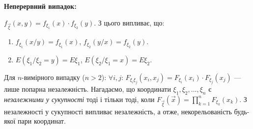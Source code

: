 \noindent\textbf{Неперервний випадок: }

$f_{\vec{\xi}}(x, y) = f_{\xi_1}(x)\cdot f_{\xi_2}(y)$.
З цього випливає, що:

\begin{enumerate}
    \item $f_{\xi_1}(x/y) = f_{\xi_1}(x)$,    
    $f_{\xi_2}(y/x) = f_{\xi_2}(y)$.
    \item $E(\xi_1 / \xi_2 = y) = E\xi_1$, 
    $E(\xi_2 / \xi_1 = x) = E\xi_2$.
\end{enumerate}

Для $n$-вимірного випадку ($n > 2$):
$\forall i,j$: $F_{\xi_i\xi_j}(x_i, x_j) = F_{\xi_i}(x_i)\cdot F_{\xi_j}(x_j)$ --- лише
попарна незалежність.
Нагадаємо, що координати $\xi_1, \xi_2, ..., \xi_n$ є \emph{незалежними у сукупності} 
    тоді і тільки тоді, коли $F_{\vec{\xi}}(\vec{x}) = 
    \prod\limits_{k=1}^n F_{\xi_k}(x_k)$.
    З незалежності у сукупності випливає незалежність, а отже, некорельованість будь-якої пари координат.